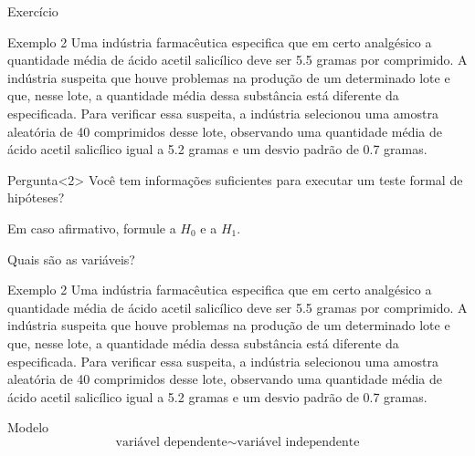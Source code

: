 \documentclass{beamer}
\begin{document}
\begin{frame}{\scriptsize Exercício}
  \begin{exampleblock}{Exemplo 2}
    \scriptsize
    Uma indústria farmacêutica especifica que em certo analgésico a
    quantidade média de ácido acetil salicílico deve ser 5.5 gramas
    por comprimido. A indústria suspeita que houve problemas na
    produção de um determinado lote e que, nesse lote, a quantidade
    média dessa substância está diferente da especificada. Para
    verificar essa suspeita, a indústria selecionou uma amostra
    aleatória de 40 comprimidos desse lote, observando uma quantidade
    média de ácido acetil salicílico igual a 5.2 gramas e um desvio
    padrão de 0.7 gramas.
  \end{exampleblock}
  \begin{block}{Pergunta}<2>
    \footnotesize
    Você tem informações suficientes para executar um teste formal de hipóteses?

    Em caso afirmativo, formule a $H_0$ e a $H_1$.
  \end{block}
\end{frame}

\begin{frame}{\scriptsize Quais são as variáveis?}
  \begin{exampleblock}{Exemplo 2}
    \tiny
    Uma indústria farmacêutica especifica que em certo analgésico a
    quantidade média de ácido acetil salicílico deve ser 5.5 gramas
    por comprimido. A indústria suspeita que houve problemas na
    produção de um determinado lote e que, nesse lote, a quantidade
    média dessa substância está diferente da especificada. Para
    verificar essa suspeita, a indústria selecionou uma amostra
    aleatória de 40 comprimidos desse lote, observando uma quantidade
    média de ácido acetil salicílico igual a 5.2 gramas e um desvio
    padrão de 0.7 gramas.
  \end{exampleblock}
  \begin{block}{Modelo}
    \footnotesize
    \begin{displaymath}
      \text{variável dependente} \sim \text{variável independente}
    \end{displaymath}
  \end{block}
\end{frame}
\end{document}
